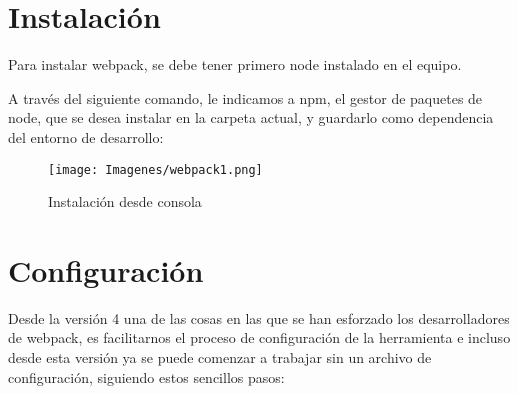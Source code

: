 \section{Instalaci\'on}
\item Para instalar webpack, se debe tener primero node instalado en el equipo. 
\item A través del siguiente comando, le indicamos a npm, el gestor de paquetes de node, que se desea  instalar en la carpeta actual, y guardarlo como dependencia del entorno de desarrollo:

\begin{figure}[h]
    \centering
    \texttt{[image: Imagenes/webpack1.png]}
    \caption{Instalaci\'on desde consola}
    \label{fig:my_label}
\end{figure}

\section{Configuraci\'on}

\item Desde la versión 4 una de las cosas en las que se han esforzado los desarrolladores de webpack, es facilitarnos el proceso de configuración de la herramienta e incluso desde esta versión ya se puede comenzar a trabajar sin un archivo de configuración, siguiendo estos sencillos pasos:


